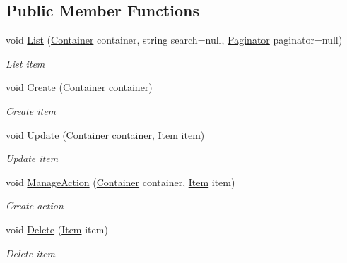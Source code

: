 \subsection*{Public Member Functions}
\begin{DoxyCompactItemize}
\item 
void \mbox{\hyperlink{class_gtd_app_1_1_console_1_1_controllers_1_1_item_controller_a556ede998439e0e55d8150d85d2b0b51}{List}} (\mbox{\hyperlink{class_gtd_app_1_1_data_1_1_container}{Container}} container, string search=null, \mbox{\hyperlink{class_gtd_app_1_1_repository_1_1_paginator}{Paginator}} paginator=null)
\begin{DoxyCompactList}\small\item\em List item \end{DoxyCompactList}\item 
void \mbox{\hyperlink{class_gtd_app_1_1_console_1_1_controllers_1_1_item_controller_a79bc2af271cbcc374eaaabe4e289b543}{Create}} (\mbox{\hyperlink{class_gtd_app_1_1_data_1_1_container}{Container}} container)
\begin{DoxyCompactList}\small\item\em Create item \end{DoxyCompactList}\item 
void \mbox{\hyperlink{class_gtd_app_1_1_console_1_1_controllers_1_1_item_controller_abf0df592b03edc253521c1b8c4f602e3}{Update}} (\mbox{\hyperlink{class_gtd_app_1_1_data_1_1_container}{Container}} container, \mbox{\hyperlink{class_gtd_app_1_1_data_1_1_item}{Item}} item)
\begin{DoxyCompactList}\small\item\em Update item \end{DoxyCompactList}\item 
void \mbox{\hyperlink{class_gtd_app_1_1_console_1_1_controllers_1_1_item_controller_ac322a034cdd1d389bc8d66c25a2ff7e1}{Manage\+Action}} (\mbox{\hyperlink{class_gtd_app_1_1_data_1_1_container}{Container}} container, \mbox{\hyperlink{class_gtd_app_1_1_data_1_1_item}{Item}} item)
\begin{DoxyCompactList}\small\item\em Create action \end{DoxyCompactList}\item 
void \mbox{\hyperlink{class_gtd_app_1_1_console_1_1_controllers_1_1_item_controller_a8138642f8999b16a5ceb3cd3e2899ffc}{Delete}} (\mbox{\hyperlink{class_gtd_app_1_1_data_1_1_item}{Item}} item)
\begin{DoxyCompactList}\small\item\em Delete item \end{DoxyCompactList}\end{DoxyCompactItemize}


